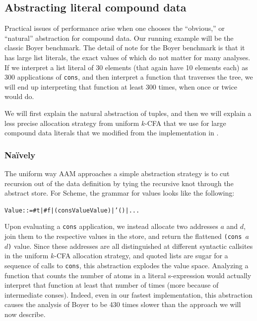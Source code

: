 \documentclass[preprint,onecolumn,9pt]{sigplanconf} %
\begin{document}
\subsection{Abstracting literal compound data}

Practical issues of performance arise when one chooses the
``obvious,'' or ``natural'' abstraction for compound data. Our running
example will be the classic Boyer benchmark. The detail of note for
the Boyer benchmark is that it has large list literals, the exact
values of which do not matter for many analyses. If we
interpret a list literal of 30 elements (that again have 10 elements
each) as 300 applications of {\tt cons}, and then interpret a function
that traverses the tree, we will end up interpreting that function at
least 300 times, when once or twice would do.

We will first explain the natural abstraction of tuples, and then we
will explain a less precise allocation strategy from uniform $k$-CFA
that we use for large compound data literals that we modified from the
implementation in \citep{dvanhorn:wright-jagannathan-toplas98}.

\subsubsection{Na\"ively}

The uniform way AAM approaches a simple abstraction strategy is to cut
recursion out of the data definition by tying the recursive knot
through the abstract store. For Scheme, the grammar for values looks
like the following:

\begin{alltt}
Value ::= #t | #f | (cons Value Value) | '() | ...
\end{alltt}

Upon evaluating a {\tt cons} application, we instead allocate two
addresses $a$ and $d$, join them to the respective values in the
store, and return the flattened {\tt (cons $a$ $d$)} value. Since
these addresses are all distinguished at different syntactic callsites
in the uniform $k$-CFA allocation strategy, and quoted lists are sugar
for a sequence of calls to {\tt cons}, this abstraction explodes the
value space. Analyzing a function that counts the number of atoms in a
literal s-expression would actually interpret that function at least
that number of times (more because of intermediate conses). Indeed,
even in our fastest implementation, this abstraction causes the
analysis of Boyer to be 430 times slower than the approach we will now
describe.
\end{document}
